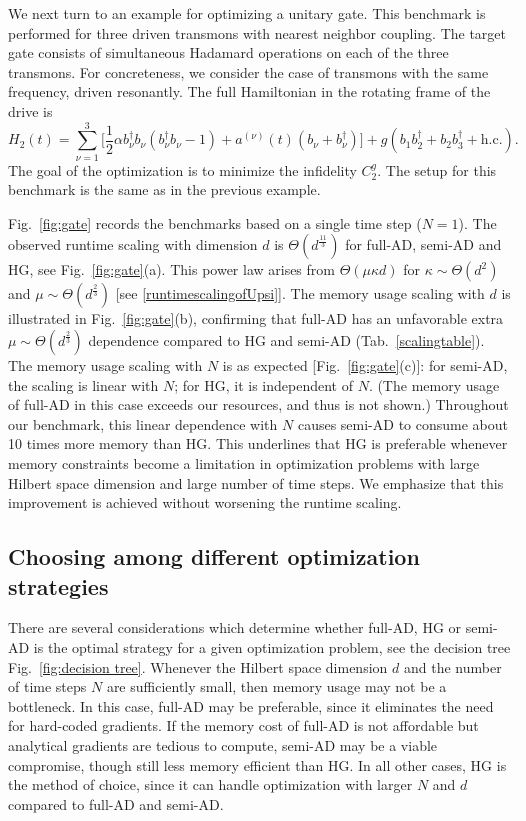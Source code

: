 \documentclass[12pt]{article}
\begin{document}
We next turn to an example for optimizing a unitary gate. This benchmark is performed for three driven transmons with nearest neighbor coupling. The target gate consists of simultaneous Hadamard operations on each of the three transmons. For concreteness, we consider the case of transmons with the same frequency, driven resonantly. The full Hamiltonian in the rotating frame of the drive is
\begin{equation}
\label{gateH}
    H_2(t)=\sum_{\nu=1}^{3}\bigg[\frac{1}{2}\alpha b_\nu^\dagger b_\nu (b_\nu^\dagger b_\nu-1)+a^{(\nu)}(t)(b_\nu+b_\nu^\dagger)\bigg]+g(b_1b_{2}^\dagger+b_2b_{3}^\dagger+\text{h.c.}).
\end{equation}
The goal of the optimization is to minimize the infidelity $C_2^{ g}$. The setup for this benchmark is the same as in the previous example.



Fig.\ \ref{fig:gate} records the  benchmarks based on a single time step ($N=1$). The observed runtime scaling with dimension $d$ is $\Theta(d^{\frac{11}{3}})$ for full-AD, semi-AD and HG, see Fig.\ \ref{fig:gate}(a). This power law arises from $\Theta(\mu\kappa d)$ for $\kappa\sim \Theta(d^2)$ and $\mu\sim \Theta(d^{\frac{2}{3}})$ [see   \ref{runtimescalingofUpsi}]. The memory usage scaling with $d$ is illustrated in Fig.\ \ref{fig:gate}(b), confirming that full-AD has an unfavorable extra $\mu \sim \Theta(d^{\frac{2}{3}})$ dependence compared to HG and semi-AD (Tab.\  \ref{scalingtable}). The memory usage scaling with $N$ is as expected [Fig.\ \ref{fig:gate}(c)]: for semi-AD, the scaling is linear with $N$; for HG, it is independent of $N$. (The memory usage of full-AD in this case exceeds our resources, and thus is not shown.) Throughout our benchmark, this linear dependence with $N$ causes semi-AD to consume about 10 times more memory than HG. This underlines that HG is preferable whenever memory constraints become a limitation in optimization problems with large Hilbert space dimension and large number of time steps. We emphasize that this improvement is achieved without worsening the runtime scaling. 


\subsection{Choosing among different optimization strategies }
\label{Decision tree}
There are several considerations which determine whether full-AD, HG or semi-AD is the optimal strategy for a given optimization problem, see the decision tree Fig.\ \ref{fig:decision tree}. Whenever the Hilbert space dimension $d$ and the number of time steps $N$ are sufficiently small, then memory usage may not be a bottleneck. In this case, full-AD may be preferable, since it eliminates the need for hard-coded gradients. If the memory cost of full-AD is not affordable but analytical gradients are tedious to compute, semi-AD may be a viable compromise, though still less memory efficient than HG. In all other cases, HG is the method of choice, since it can handle optimization with larger $N$ and $d$ compared to full-AD and semi-AD. 
\end{document}
